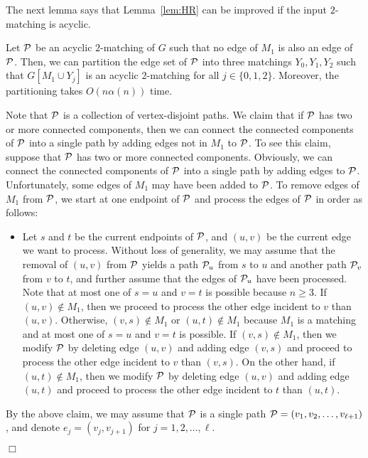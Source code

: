 \documentclass[11pt,twoside]{article}\usepackage{amssymb,latexsym,graphicx,hyperref}\usepackage{epstopdf}
\newenvironment{proof}{{\sc Proof. }}{\hfill$\Box$\vspace{0.2in}}
\begin{document}
The next lemma says that Lemma~\ref{lem:HR} can be improved if the input $2$-matching is acyclic. 

\begin{lemma}\label{lem:mine}
Let ${\cal P}$ be an acyclic $2$-matching of $G$ such that no edge of $M_1$ is also an edge of ${\cal P}$.
Then, we can partition the edge set of ${\cal P}$ into three matchings $Y_0, Y_1, Y_2$
such that $G[M_1 \cup Y_j]$ is an acyclic $2$-matching for all $j \in \{0, 1, 2\}$.
Moreover, the partitioning takes $O(n \alpha(n))$ time. 
\end{lemma}
\begin{proof}
Note that ${\cal P}$ is a collection of vertex-disjoint paths.
We claim that if ${\cal P}$ has two or more connected components,
then we can connect the connected components of ${\cal P}$ into a single path by adding edges not in $M_1$ to ${\cal P}$.
To see this claim, suppose that ${\cal P}$ has two or more connected components.
Obviously, we can connect the connected components of ${\cal P}$ into a single path by adding edges to ${\cal P}$. 
Unfortunately, some edges of $M_1$ may have been added to ${\cal P}$. 
To remove edges of $M_1$ from ${\cal P}$, we start at one endpoint of ${\cal P}$ and process the edges of ${\cal P}$ in order as follows: 
\begin{itemize}
\item
	Let $s$ and $t$ be the current endpoints of ${\cal P}$, and $(u,v)$ be the current edge we want to process.
	Without loss of generality, we may assume that the removal of $(u,v)$ from ${\cal P}$ yields a path ${\cal P}_u$ from $s$ to $u$
	and another path ${\cal P}_v$ from $v$ to $t$, and further assume that the edges of ${\cal P}_u$ have been processed.
	Note that at most one of $s = u$ and $v = t$ is possible because $n \ge 3$.
	If $(u,v) \not\in M_1$, then we proceed to process the other edge incident to $v$ than $(u,v)$.
	Otherwise, $(v,s)\not\in M_1$ or $(u,t) \not\in M_1$ because $M_1$ is a matching and at most one of $s = u$ and $v = t$ is possible.
	If $(v,s) \not\in M_1$, then we modify ${\cal P}$ by deleting edge $(u,v)$ and adding edge $(v,s)$ and
	proceed to process the other edge incident to $v$ than $(v,s)$.
	On the other hand, if $(u,t) \not\in M_1$, then we modify ${\cal P}$ by deleting edge $(u,v)$ and adding edge $(u,t)$ and
	proceed to process the other edge incident to $t$ than $(u,t)$. 
\end{itemize}

By the above claim, we may assume that ${\cal P}$ is a single path ${\cal P} = (v_1, v_2, \ldots, v_{\ell+1})$,
and denote $e_j=(v_j, v_{j+1})$ for $j = 1, 2, \ldots, \ell$. 



\end{proof}
\end{document}
